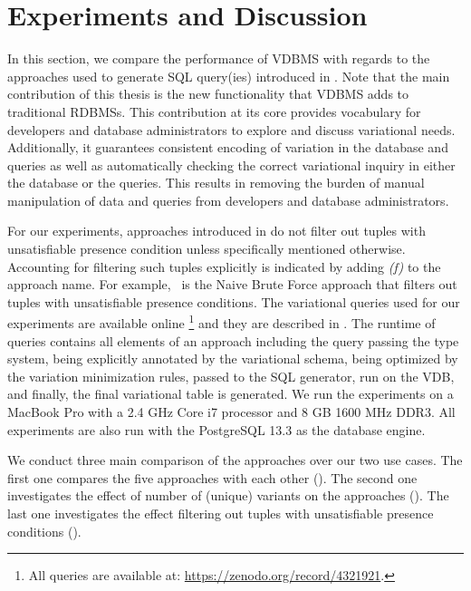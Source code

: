 \section{Experiments and Discussion}
\label{sec:exp}


In this section, we compare the performance of VDBMS with regards
to the approaches used to generate SQL query(ies) introduced in .
%
Note that the main contribution of this thesis is the new functionality that VDBMS 
adds to traditional RDBMSs. This contribution at its core provides vocabulary for developers
and database administrators to explore and discuss variational needs. 
%
Additionally, it guarantees consistent encoding of variation in the database and
queries as well as automatically checking the correct variational inquiry in either
the database or the queries. This results in removing the burden of manual 
manipulation of data and queries from developers and database administrators. 

%
For our experiments, approaches introduced in  do not filter out 
tuples with unsatisfiable presence condition unless specifically mentioned otherwise.
Accounting for filtering such tuples explicitly is indicated by adding \emph{(f)} to
the approach name. For example, \nbff\ is the Naive Brute Force approach that 
filters out tuples with unsatisfiable presence conditions. 
%
The variational queries used for our experiments are available online
%
\footnote{All queries are available at: \url{https://zenodo.org/record/4321921}.}
and they are described in .
%
The runtime of queries contains all elements of an approach including the query
passing the type system, being explicitly annotated by the variational schema, 
being optimized by the variation minimization rules, passed to the SQL generator, 
run on the VDB, and finally, the final variational table is generated. 
%
We run the experiments on a MacBook Pro with a 2.4 GHz Core i7 processor and 
8 GB 1600 MHz DDR3. All experiments are also run with the PostgreSQL 13.3 as 
the database engine. 

We conduct three main 
comparison of the approaches over our two use cases. The first one 
compares the five approaches with each other (). The second one
investigates the effect of number of (unique) variants on the approaches (). 
The last one investigates the effect filtering out
tuples with unsatisfiable presence conditions (). 



